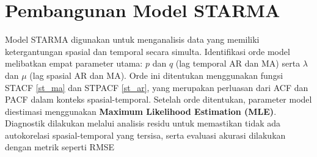 \section{Pembangunan Model STARMA}
Model STARMA digunakan untuk menganalisis data yang memiliki ketergantungan spasial dan temporal secara simulta. Identifikasi orde model melibatkan empat parameter utama: $p$ dan $q$ (lag temporal AR dan MA) serta $\lambda$ dan $\mu$ (lag spasial AR dan MA). Orde ini ditentukan menggunakan fungsi STACF \ref{st_ma} dan STPACF \ref{st_ar}, yang merupakan perluasan dari ACF dan PACF dalam konteks spasial-temporal. Setelah orde ditentukan, parameter model diestimasi menggunakan \textbf{Maximum Likelihood Estimation (MLE)}. Diagnostik dilakukan melalui analisis residu untuk memastikan tidak ada autokorelasi spasial-temporal yang tersisa, serta evaluasi akurasi dilakukan dengan metrik seperti RMSE